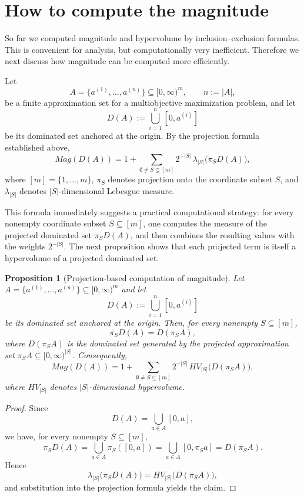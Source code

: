 \documentclass{article}
\def\HV{HV}%
\def\Mag{Mag}%
\newtheorem{proposition}[theorem]{Proposition}
\theoremstyle{definition}
\newcommand{\Mag}{\operatorname{Mag}}
\newcommand{\HV}{\operatorname{HV}}
\newcommand{\1}{\mathbf{1}}
\begin{document}
\section{How to compute the magnitude}

So far we computed magnitude and hypervolume by inclusion--exclusion formulas. This is convenient for analysis, but computationally very inefficient. Therefore we next discuss how magnitude can be computed more efficiently.

Let
\[
A=\{a^{(1)},\dots,a^{(n)}\}\subseteq [0,\infty)^m,
\qquad n:=|A|,
\]
be a finite approximation set for a multiobjective maximization problem, and let
\[
D(A):=\bigcup_{i=1}^{n}[0,a^{(i)}]
\]
be its dominated set anchored at the origin. By the projection formula established above,
\[
\Mag(D(A))
=
1+\sum_{\emptyset\neq S\subseteq [m]}2^{-|S|}\,
\lambda_{|S|}\!\bigl(\pi_S D(A)\bigr),
\]
where \([m]=\{1,\dots,m\}\), \(\pi_S\) denotes projection onto the coordinate subset \(S\), and \(\lambda_{|S|}\) denotes \(|S|\)-dimensional Lebesgue measure.

This formula immediately suggests a practical computational strategy: for every nonempty coordinate subset \(S\subseteq [m]\), one computes the measure of the projected dominated set \(\pi_S D(A)\), and then combines the resulting values with the weights \(2^{-|S|}\). The next proposition shows that each projected term is itself a hypervolume of a projected dominated set.

\begin{proposition}[Projection-based computation of magnitude]
Let \(A=\{a^{(1)},\dots,a^{(n)}\}\subseteq [0,\infty)^m\) and let
\[
D(A):=\bigcup_{i=1}^{n}[0,a^{(i)}]
\]
be its dominated set anchored at the origin. Then, for every nonempty \(S\subseteq [m]\),
\[
\pi_S D(A)=D(\pi_S A),
\]
where \(D(\pi_S A)\) is the dominated set generated by the projected approximation set
\(\pi_S A\subseteq [0,\infty)^{|S|}\). Consequently,
\[
\Mag(D(A))
=
1+\sum_{\emptyset\neq S\subseteq [m]}2^{-|S|}\,
\HV_{|S|}\!\bigl(D(\pi_S A)\bigr),
\]
where \(\HV_{|S|}\) denotes \(|S|\)-dimensional hypervolume.
\end{proposition}

\begin{proof}
Since
\[
D(A)=\bigcup_{a\in A}[0,a],
\]
we have, for every nonempty \(S\subseteq [m]\),
\[
\pi_S D(A)
=
\bigcup_{a\in A}\pi_S([0,a])
=
\bigcup_{a\in A}[0,\pi_S a]
=
D(\pi_S A).
\]
Hence
\[
\lambda_{|S|}\!\bigl(\pi_S D(A)\bigr)
=
\HV_{|S|}\!\bigl(D(\pi_S A)\bigr),
\]
and substitution into the projection formula yields the claim.
\end{proof}
\end{document}
